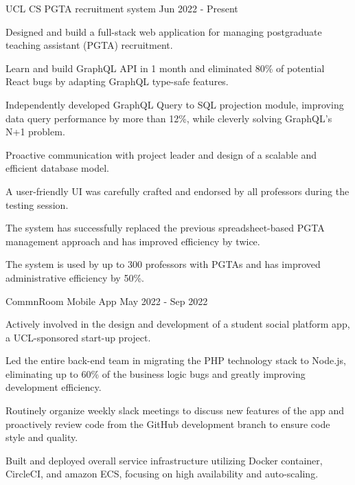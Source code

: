 \begin{cventries}
  \cventry
    {}
    {UCL CS PGTA recruitment system}{}
    {Jun 2022 - Present}
    {
      \begin{cvitems}
        \item {Designed and build a full-stack web application for managing postgraduate teaching assistant (PGTA) recruitment.}
        \item {Learn and build GraphQL API in 1 month and eliminated 80\% of potential React bugs by adapting GraphQL type-safe features.}
        \item {Independently developed GraphQL Query to SQL projection module, improving data query performance by more than 12\%, while cleverly solving GraphQL's N+1 problem.}
        \item {Proactive communication with project leader and design of a scalable and efficient database model.}
        \item {A user-friendly UI was carefully crafted and endorsed by all professors during the testing session.}
        \item {The system has successfully replaced the previous spreadsheet-based PGTA management approach and has improved efficiency by twice.}
        \item {The system is used by up to 300 professors with PGTAs and has improved administrative efficiency by 50\%.}
      \end{cvitems}
    }

  \cventry
    {}
    {CommnRoom Mobile App}
    {}
    {May 2022 - Sep 2022}
    {
      \begin{cvitems}
        \item {Actively involved in the design and development of a student social platform app, a UCL-sponsored start-up project.}
        \item {Led the entire back-end team in migrating the PHP technology stack to Node.js, eliminating up to 60\% of the business logic bugs and greatly improving development efficiency.}
        \item {Routinely organize weekly slack meetings to discuss new features of the app and proactively review code from the GitHub development branch to ensure code style and quality.}
        \item {Built and deployed overall service infrastructure utilizing Docker container, CircleCI, and amazon ECS, focusing on high availability and auto-scaling.}
      \end{cvitems}
    }


\end{cventries}
